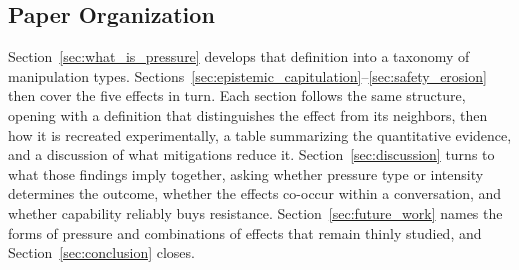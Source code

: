 \subsection{Paper Organization}
\label{sec:intro_organization}

Section~\ref{sec:what_is_pressure} develops that definition into a taxonomy of manipulation types. Sections~\ref{sec:epistemic_capitulation}--\ref{sec:safety_erosion} then cover the five effects in turn. Each section follows the same structure, opening with a definition that distinguishes the effect from its neighbors, then how it is recreated experimentally, a table summarizing the quantitative evidence, and a discussion of what mitigations reduce it. Section~\ref{sec:discussion} turns to what those findings imply together, asking whether pressure type or intensity determines the outcome, whether the effects co-occur within a conversation, and whether capability reliably buys resistance. Section~\ref{sec:future_work} names the forms of pressure and combinations of effects that remain thinly studied, and Section~\ref{sec:conclusion} closes.
